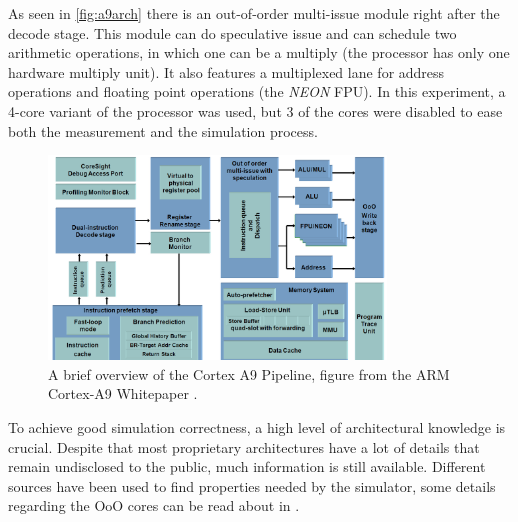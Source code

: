 As seen in \autoref{fig:a9arch} there is an out-of-order multi-issue module
right after the decode stage. This module can do speculative issue and can
schedule two arithmetic operations, in which one can be a multiply (the
processor has only one hardware multiply unit). It also features a multiplexed
lane for address operations and floating point operations (the \emph{NEON} FPU).
In this experiment, a 4-core variant of the processor was used, but 3 of the
cores were disabled to ease both the measurement and the simulation process.

\begin{figure}[bht]
    \centering
    \includegraphics[width=0.8\textwidth]{figs/A9-Pipeline-hres.jpg}
    \caption{A brief overview of the Cortex A9 Pipeline, figure from the ARM
    Cortex-A9 Whitepaper \cite{a9whitepaper}.}
    \label{fig:a9arch}
\end{figure}

To achieve good simulation correctness, a high level of architectural knowledge
is crucial. Despite that most proprietary architectures have a lot of details
that remain undisclosed to the public, much information is still available.
Different sources have been used to find properties needed by the simulator,
some details regarding the OoO cores can be read about in
\cite{blem2013detailed}.
